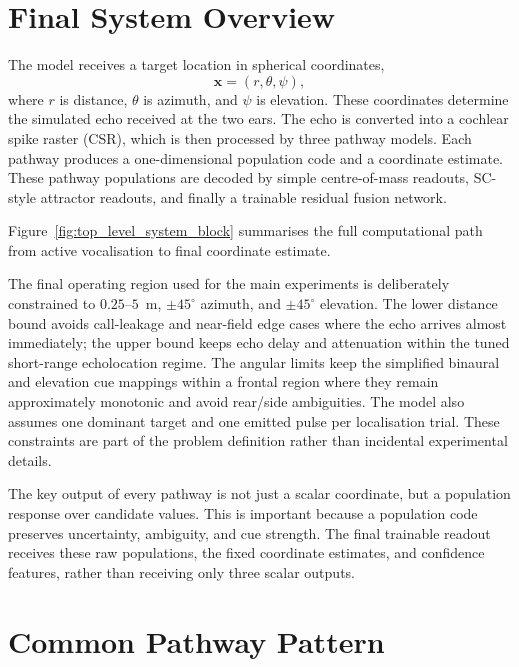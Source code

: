 \section{Final System Overview}

The model receives a target location in spherical coordinates,
\begin{equation}
    \mathbf{x} = (r,\theta,\psi),
\end{equation}
where $r$ is distance, $\theta$ is azimuth, and $\psi$ is elevation. These coordinates determine the simulated echo received at the two ears. The echo is converted into a cochlear spike raster (CSR), which is then processed by three pathway models. Each pathway produces a one-dimensional population code and a coordinate estimate. These pathway populations are decoded by simple centre-of-mass readouts, SC-style attractor readouts, and finally a trainable residual fusion network.



Figure~\ref{fig:top_level_system_block} summarises the full computational path from active vocalisation to final coordinate estimate.

The final operating region used for the main experiments is deliberately constrained to $0.25$--$5$~m, $\pm45^\circ$ azimuth, and $\pm45^\circ$ elevation. The lower distance bound avoids call-leakage and near-field edge cases where the echo arrives almost immediately; the upper bound keeps echo delay and attenuation within the tuned short-range echolocation regime. The angular limits keep the simplified binaural and elevation cue mappings within a frontal region where they remain approximately monotonic and avoid rear/side ambiguities. The model also assumes one dominant target and one emitted pulse per localisation trial. These constraints are part of the problem definition rather than incidental experimental details.

The key output of every pathway is not just a scalar coordinate, but a population response over candidate values. This is important because a population code preserves uncertainty, ambiguity, and cue strength. The final trainable readout receives these raw populations, the fixed coordinate estimates, and confidence features, rather than receiving only three scalar outputs.

\section{Common Pathway Pattern}

